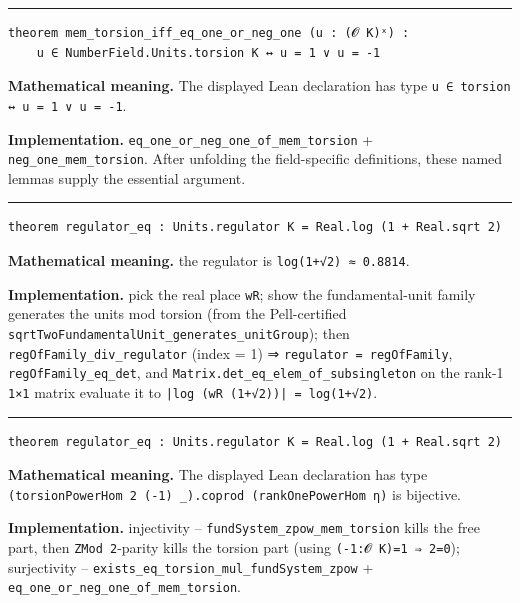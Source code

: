 \documentclass[UTF8,a4paper,11pt,fontset=fandol]{ctexart}
\theoremstyle{definition}
\newcommand{\statementsep}{\par\medskip\hrule\medskip}
\begin{document}
\statementsep
\begin{verbatim}
theorem mem_torsion_iff_eq_one_or_neg_one (u : (𝓞 K)ˣ) :
    u ∈ NumberField.Units.torsion K ↔ u = 1 ∨ u = -1
\end{verbatim}
\noindent\textbf{Mathematical meaning.} The displayed Lean declaration has type \texttt{u ∈ torsion ↔ u = 1 ∨ u = -1}.\par
\noindent\textbf{Implementation.} \texttt{eq\_\allowbreak{}one\_\allowbreak{}or\_\allowbreak{}neg\_\allowbreak{}one\_\allowbreak{}of\_\allowbreak{}mem\_\allowbreak{}torsion} + \texttt{neg\_\allowbreak{}one\_\allowbreak{}mem\_\allowbreak{}torsion}. After unfolding the field-specific definitions, these named lemmas supply the essential argument.\par
\statementsep
\begin{verbatim}
theorem regulator_eq : Units.regulator K = Real.log (1 + Real.sqrt 2)
\end{verbatim}
\noindent\textbf{Mathematical meaning.} the regulator is \texttt{log(1+√2) ≈ 0.\allowbreak{}8814}.\par
\noindent\textbf{Implementation.} pick the real place \texttt{wR}; show the fundamental-unit family generates the units mod torsion (from the Pell-certified \texttt{sqrtTwoFundamentalUnit\_\allowbreak{}generates\_\allowbreak{}unitGroup}); then \texttt{regOfFamily\_\allowbreak{}div\_\allowbreak{}regulator} (index = 1) ⇒ \texttt{regulator = regOfFamily}, \texttt{regOfFamily\_\allowbreak{}eq\_\allowbreak{}det}, and \texttt{Matrix.\allowbreak{}det\_\allowbreak{}eq\_\allowbreak{}elem\_\allowbreak{}of\_\allowbreak{}subsingleton} on the rank-1 \texttt{1×1} matrix evaluate it to \texttt{|log (wR (1+√2))| = log(1+√2)}.\par
\statementsep
\begin{verbatim}
theorem regulator_eq : Units.regulator K = Real.log (1 + Real.sqrt 2)
\end{verbatim}
\noindent\textbf{Mathematical meaning.} The displayed Lean declaration has type \texttt{(torsionPowerHom 2 (-1) \_\allowbreak{}).\allowbreak{}coprod (rankOnePowerHom η)} is bijective.\par
\noindent\textbf{Implementation.} injectivity -- \texttt{fundSystem\_\allowbreak{}zpow\_\allowbreak{}mem\_\allowbreak{}torsion} kills the free part, then \texttt{ZMod 2}-parity kills the torsion part (using \texttt{(-1:𝓞 K)=1 ⇒ 2=0}); surjectivity -- \texttt{exists\_\allowbreak{}eq\_\allowbreak{}torsion\_\allowbreak{}mul\_\allowbreak{}fundSystem\_\allowbreak{}zpow} + \texttt{eq\_\allowbreak{}one\_\allowbreak{}or\_\allowbreak{}neg\_\allowbreak{}one\_\allowbreak{}of\_\allowbreak{}mem\_\allowbreak{}torsion}.\par
\end{document}
